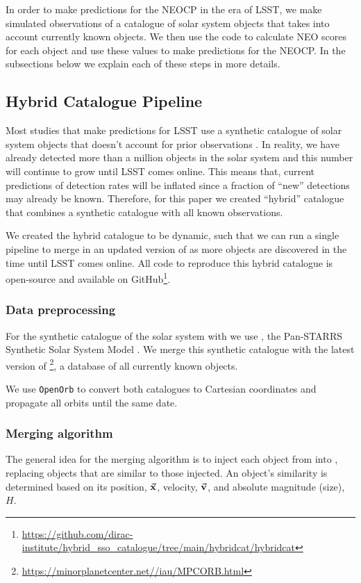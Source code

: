 In order to make predictions for the NEOCP in the era of LSST, we make simulated observations of a catalogue of solar system objects that takes into account currently known objects. We then use the \dig{} code to calculate NEO scores for each object and use these values to make predictions for the NEOCP. In the subsections below we explain each of these steps in more details.

\subsection{Hybrid Catalogue Pipeline}
Most studies that make predictions for LSST use a synthetic catalogue of solar system objects that doesn't account for prior observations \needcite{}. In reality, we have already detected more than a million objects in the solar system and this number will continue to grow until LSST comes online. This means that, current predictions of detection rates will be inflated since a fraction of ``new'' detections may already be known. Therefore, for this paper we created ``hybrid'' catalogue that combines a synthetic catalogue with all known observations.

We created the hybrid catalogue to be dynamic, such that we can run a single pipeline to merge in an updated version of \mpco{} as more objects are discovered in the time until LSST comes online. All code to reproduce this hybrid catalogue is open-source and available on GitHub\footnote{\url{https://github.com/dirac-institute/hybrid_sso_catalogue/tree/main/hybridcat/hybridcat}}.

\subsubsection{Data preprocessing}
For the synthetic catalogue of the solar system with we use \sss{}, the Pan-STARRS Synthetic Solar System Model \citep{Grav+2011}. We merge this synthetic catalogue with the latest version of \mpco{}\footnote{\url{https://minorplanetcenter.net//iau/MPCORB.html}}, a database of all currently known objects.

We use \texttt{OpenOrb} \citep{Granvik+2009} to convert both catalogues to Cartesian coordinates and propagate all orbits until the same date.

\subsubsection{Merging algorithm}
The general idea for the merging algorithm is to inject each object from \mpco{} into \sss{}, replacing objects that are similar to those injected. An object's similarity is determined based on its position, $\va{x}$, velocity, $\va{v}$, and absolute magnitude (size), ${H}$.

